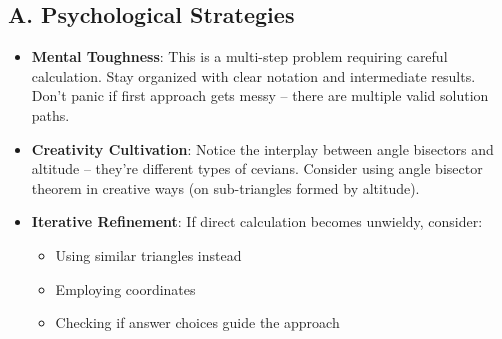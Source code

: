 \documentclass[12pt]{article}
\begin{document}
\begin{strategicbox}
\subsection*{A. Psychological Strategies}
\begin{itemize}[leftmargin=*]
    \item \textbf{Mental Toughness}: This is a multi-step problem requiring careful calculation. Stay organized with clear notation and intermediate results. Don't panic if first approach gets messy -- there are multiple valid solution paths.
    \item \textbf{Creativity Cultivation}: Notice the interplay between angle bisectors and altitude -- they're different types of cevians. Consider using angle bisector theorem in creative ways (on sub-triangles formed by altitude).
    \item \textbf{Iterative Refinement}: If direct calculation becomes unwieldy, consider:
    \begin{itemize}
        \item Using similar triangles instead
        \item Employing coordinates
        \item Checking if answer choices guide the approach
    \end{itemize}
\end{itemize}


\end{strategicbox}
\end{document}

